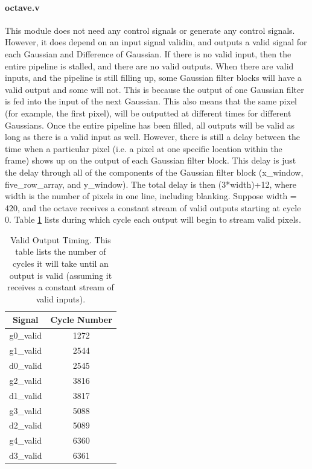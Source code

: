\paragraph{octave.v}
This module does not need any control signals or generate any control signals. 
However, it does depend on an input signal validin, and outputs a valid signal 
for each Gaussian and Difference of Gaussian. If there is no valid input, then 
the entire pipeline is stalled, and there are no valid outputs. When there are 
valid inputs, and the pipeline is still filling up, some Gaussian filter blocks 
will have a valid output and some will not. This is because the output of one 
Gaussian filter is fed into the input of the next Gaussian. This also means that 
the same pixel (for example, the first pixel), will be outputted at different 
times for different Gaussians. Once the entire pipeline has been filled, all 
outputs will be valid as long as there is a valid input as well. However, there 
is still a delay between the time when a particular pixel (i.e. a pixel at one 
specific location within the frame) shows up on the output of each Gaussian 
filter block. This delay is just the delay through all of the components of the 
Gaussian filter block (x\_window, five\_row\_array, and y\_window). The total delay 
is then (3*width)+12, where width is the number of pixels in one line, including 
blanking. Suppose width = 420, and the octave receives a constant stream of 
valid outputs starting at cycle 0. Table \ref{wrap-tab:valids} lists during which cycle each
output will begin to stream valid pixels.

\begin{table}
\begin{tabular}{c | c} \toprule
 Signal & Cycle Number \\\toprule
 g0\_valid & 1272 \\
 g1\_valid & 2544 \\
 d0\_valid & 2545 \\
 g2\_valid & 3816 \\
 d1\_valid & 3817 \\
 g3\_valid & 5088 \\
 d2\_valid & 5089 \\
 g4\_valid & 6360 \\
 d3\_valid & 6361 \\
\end{tabular}
\caption{Valid Output Timing. This table lists the number of cycles it will take until an output is valid (assuming it receives a constant stream of valid inputs).}\label{wrap-tab:valids}
\end{table}

